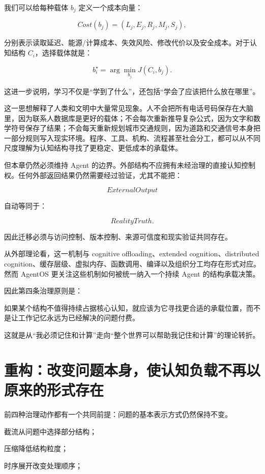 我们可以给每种载体 $b_j$ 定义一个成本向量：

\[
Cost(b_j)
=
(
L_j,
E_j,
R_j,
M_j,
S_j
),
\]

分别表示读取延迟、能源/计算成本、失效风险、修改代价以及安全成本。对于认知结构 $C_i$，选择载体就是：

\[
b_i^\star
=
\arg\min_{b_j}
J(C_i,b_j).
\]

这进一步说明，学习不仅是“学到了什么”，还包括“学会了应该把什么放在哪里”。

这一思想解释了人类和文明中大量常见现象。人不会把所有电话号码保存在大脑里，因为联系人数据库是更好的载体；不会每次重新推导复杂公式，因为文字和数学符号保存了结果；不会每天重新规划城市交通规则，因为道路和交通信号本身把一部分规则写入现实环境。程序、工具、机构、流程甚至社会分工，都可以从不同尺度理解为认知结构寻找了更稳定、更低成本的承载体。

但本章仍然必须维持 Agent 的边界。外部结构不应拥有未经治理的直接认知控制权。任何外部返回结果仍然需要经过验证，尤其不能把：

\[
ExternalOutput
\]

自动等同于：

\[
RealityTruth.
\]

因此迁移必须与访问控制、版本控制、来源可信度和现实验证共同存在。

从外部理论看，这一机制与 cognitive offloading、extended cognition、distributed cognition、缓存层级、虚拟内存、函数调用、编译以及组织分工均存在形式对应。然而 AgentOS 更关注这些机制如何被统一纳入一个持续 Agent 的结构承载决策。

因此第四条治理原则是：

\begin{proposition*}
如果某个结构不值得持续占据核心认知，就应该为它寻找更合适的承载位置，而不是让工作记忆永远为已经解决的问题付费。
\end{proposition*}

这就是从“我必须记住和计算”走向“整个世界可以帮助我记住和计算”的理论转折。

\section{重构：改变问题本身，使认知负载不再以原来的形式存在}

前四种治理动作都有一个共同前提：问题的基本表示方式仍然保持不变。

截流从问题中选择部分结构；

压缩降低结构粒度；

时序展开改变处理顺序；

